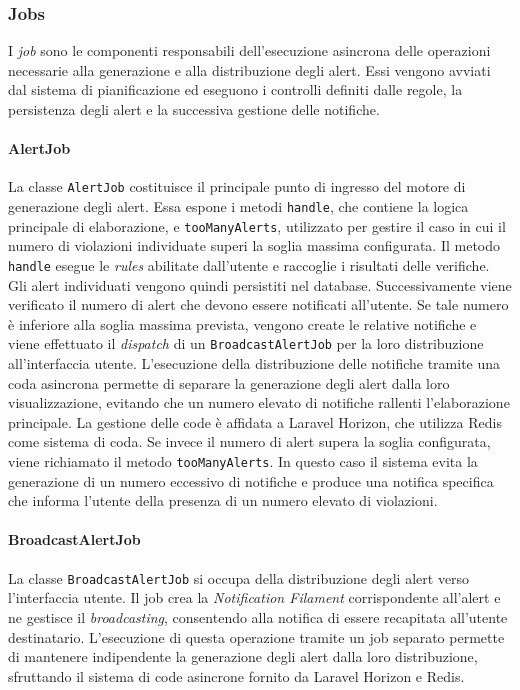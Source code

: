 \subsubsection{Jobs}
I \textit{job} sono le componenti responsabili dell'esecuzione asincrona delle operazioni necessarie alla generazione e alla distribuzione degli alert. Essi vengono avviati 
dal sistema di pianificazione ed eseguono i controlli definiti dalle regole, la persistenza degli alert e la successiva gestione delle notifiche.

\paragraph{AlertJob}
La classe \texttt{AlertJob} costituisce il principale punto di ingresso del motore di generazione degli alert. Essa espone i metodi \texttt{handle}, che contiene 
la logica principale di elaborazione, e \texttt{tooManyAlerts}, utilizzato per gestire il caso in cui il numero di violazioni individuate superi la soglia massima configurata.
\newline
Il metodo \texttt{handle} esegue le \textit{rules} abilitate dall'utente e raccoglie i risultati delle verifiche. Gli alert individuati vengono quindi persistiti nel database. 
Successivamente viene verificato il numero di alert che devono essere notificati all'utente. Se tale numero è inferiore alla soglia massima prevista, vengono create le relative 
notifiche e viene effettuato il \textit{dispatch} di un \texttt{BroadcastAlertJob} per la loro distribuzione all'interfaccia utente.
\newline
L'esecuzione della distribuzione delle notifiche tramite una coda asincrona permette di separare la generazione degli alert dalla loro visualizzazione, evitando che un numero 
elevato di notifiche rallenti l'elaborazione principale. La gestione delle code è affidata a Laravel Horizon, che utilizza Redis come sistema di coda.
\newline
Se invece il numero di alert supera la soglia configurata, viene richiamato il metodo \texttt{tooManyAlerts}. In questo caso il sistema evita la generazione di un numero 
eccessivo di notifiche e produce una notifica specifica che informa l'utente della presenza di un numero elevato di violazioni.

\paragraph{BroadcastAlertJob}
La classe \texttt{BroadcastAlertJob} si occupa della distribuzione degli alert verso l'interfaccia utente. Il job crea la \textit{Notification Filament} corrispondente all'alert 
e ne gestisce il \textit{broadcasting}, consentendo alla notifica di essere recapitata all'utente destinatario.
\newline
L'esecuzione di questa operazione tramite un job separato permette di mantenere indipendente la generazione degli alert dalla loro distribuzione, sfruttando il sistema di code 
asincrone fornito da Laravel Horizon e Redis.

